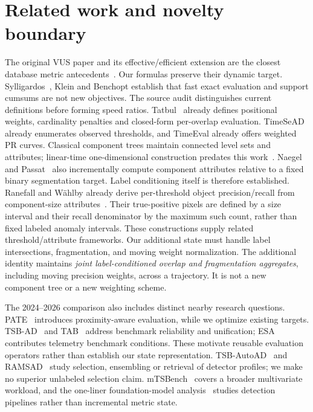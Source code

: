 \section{Related work and novelty boundary}
The original VUS paper and its effective/efficient extension are the closest
database metric antecedents~\cite{paparrizos2022,boniol2025}. Our formulas
preserve their dynamic target. Sylligardos~\cite{sylligardos2025}, Klein and
Benchopt establish that fast exact evaluation and support cumsums are not new
objectives. The source audit distinguishes current definitions before forming
speed ratios. Tatbul~\cite{tatbul2018} already defines positional weights,
cardinality penalties and closed-form per-overlap evaluation. TimeSeAD already
enumerates observed thresholds, and TimeEval already offers weighted PR curves.
Classical component trees maintain connected level sets and attributes;
linear-time one-dimensional construction predates this work~\cite{najman2006,menotti2007}.
Naegel and Passat~\cite{naegel2014} also incrementally compute component
attributes relative to a fixed binary segmentation target. Label conditioning
itself is therefore established.
Ranefall and W{\"a}hlby already derive per-threshold object precision/recall
from component-size attributes~\cite{ranefall2016}. Their true-positive pixels
are defined by a size interval and their recall denominator by the maximum
such count, rather than fixed labeled anomaly intervals. These constructions
supply related threshold/attribute frameworks. Our additional state must
handle label intersections, fragmentation, and moving weight normalization.
The additional identity maintains \emph{joint label-conditioned overlap and
fragmentation aggregates}, including moving precision weights, across a
trajectory. It is not a new component tree or a new weighting scheme.

The 2024--2026 comparison also includes distinct nearby research questions.
PATE~\cite{ghorbani2024pateproximityawaretimeseries} introduces proximity-aware
evaluation, while we optimize existing targets. TSB-AD~\cite{tsbad} and
TAB~\cite{qiu2025tabunifiedbenchmarkingtime} address benchmark reliability and
unification; ESA~\cite{esa2024} contributes telemetry benchmark conditions.
These motivate reusable evaluation operators rather than establish our state
representation. TSB-AutoAD~\cite{liu2025autoad} and
RAMSAD~\cite{panourgias2026retrievaltrainingsimilaritysearchbased} study selection,
ensembling or retrieval of detector profiles; we make no superior unlabeled
selection claim. mTSBench~\cite{mtsbench} covers a broader multivariate workload,
and the one-liner foundation-model analysis~\cite{zhu2026} studies detection
pipelines rather than incremental metric state.

